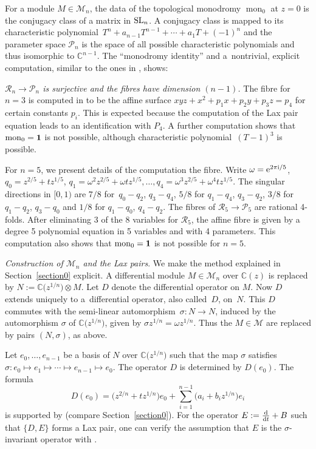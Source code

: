 \documentclass[10pt,a4paper]{amsart}
\numberwithin{equation}{section}
\begin{document}
For a module $M\in \mathcal{M}_n$, the data of the topological monodromy $\operatorname{mon}_0$ at $z=0$ is the conjugacy class of a matrix in ${\rm SL}_n$.
A conjugacy class is mapped to its characteristic polynomial~${T^n+a_{n-1}T^{n-1}+\cdots +a_1T+(-1)^n}$ and the parameter space
$\mathcal{P}_n$ is the space of all possible characteristic polynomials and thus isomorphic to $\mathbb{C}^{n-1}$.
The ``monodromy identity'' and a~nontrivial, explicit computation, similar to the ones in \cite{CM-vdP}, shows:

{\it $\mathcal{R}_n\rightarrow \mathcal{P}_n$ is surjective and the fibres have dimension $(n-1)$.}
 The fibre for $n=3$ is computed in \cite{vdP-T} to be the affine surface $xyz+x^2+p_1x+p_2y+p_3z=p_4$ for certain constants $p_i$.
 This is expected because the computation of the Lax pair equation leads to an identification with $P_4$.
 A further computation shows that $\operatorname{mon}_0={\bf 1}$ is not possible, although characteristic polynomial~${(T-1)^3}$ is possible.

 For $n=5$, we present details of the computation the fibre. Write
 $\omega ={\rm e}^{2\pi {\rm i}/5}$, $q_0=z^{2/5}+tz^{1/5}$,
 $q_1=\omega^2z^{2/5}+\omega t z^{1/5}, \dots , q_4=\omega^3z^{2/5}+\omega^4tz^{1/5}$.
 The singular directions in $[0,1)$ are $7/8$ for~${q_0-q_2}$, $ q_3-q_4$, $5/8$ for $q_1-q_4$, $ q_3-q_2$, $3/8$ for $q_1-q_2$, $ q_3-q_0$ and
 $1/8$ for $q_1-q_0$, $ q_4-q_2$. The fibres of $\mathcal{R}_5\rightarrow \mathcal{P}_5$ are rational 4-folds. After eliminating 3 of the 8
 variables for $\mathcal{R}_5$, the affine fibre is given by a degree 5 polynomial equation in 5 variables and with 4 parameters.
This computation also shows that $\operatorname{mon}_0={\bf 1}$ is not possible for $n=5$.

{\it Construction of $\mathcal{M}_n$ and the Lax pairs}.
We make the method explained in Section~\ref{section0} explicit. A differential module
$M\in \mathcal{M}_n$ over $\mathbb{C}(z)$ is replaced by $N:=\mathbb{C}\bigl(z^{1/n}\bigr)\otimes M$. Let $D$ denote the differential operator
 on $M$. Now $D$ extends uniquely to a~differential operator, also called~$D$, on~$N$. This $D$ commutes
with the semi-linear automorphism~${\sigma\colon N\rightarrow N}$, induced by the automorphism $\sigma$ of $\mathbb{C}\bigl(z^{1/n}\bigr)$, given by
$\sigma z^{1/n}=\omega z^{1/n}$. Thus the $M\in \mathcal{M}$ are replaced by pairs $(N,\sigma)$, as above.


 Let $e_0,\dots ,e_{n-1}$ be a basis of $N$ over $\mathbb{C}\bigl(z^{1/n}\bigr)$ such that the map $\sigma$
 satisfies $\sigma \colon e_0\mapsto e_1\mapsto \cdots \mapsto e_{n-1}\mapsto e_0$. The operator $D$ is determined by
 $D(e_0)$. The formula
 \[
 D(e_0)=\bigl(z^{2/n}+tz^{1/n}\bigr)e_0+\sum _{i=1}^{n-1}\bigl(a_i+b_iz^{1/n}\bigr)e_i
 \]
 is supported by \cite[Sections~12.3--12.5]{vdP-Si} (compare Section~\ref{section0}).
 For the operator $E:=\frac{{\rm d}}{{\rm d}t}+B$ such that $\{D, E\}$ forms a Lax pair, one can verify the assumption that $E$
is the $\sigma$-invariant operator with .
\end{document}
